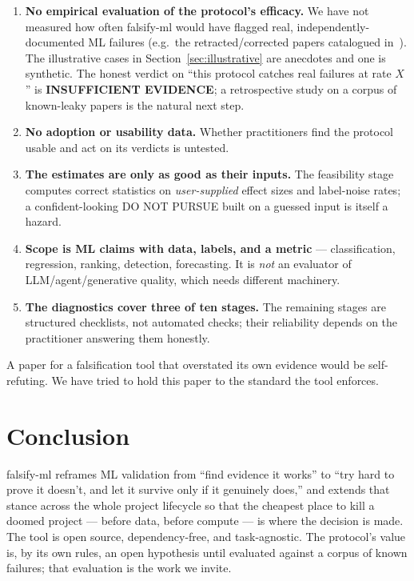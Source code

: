 \documentclass[11pt]{article}
\begin{document}
\begin{enumerate}[leftmargin=*]
\item \textbf{No empirical evaluation of the protocol's efficacy.} We have not measured how often
falsify-ml would have flagged real, independently-documented ML failures (e.g.\ the
retracted/corrected papers catalogued in~\cite{kapoor2023leakage}). The illustrative cases in
Section~\ref{sec:illustrative} are anecdotes and one is synthetic. The honest verdict on ``this
protocol catches real failures at rate $X$'' is \textbf{INSUFFICIENT EVIDENCE}; a retrospective study
on a corpus of known-leaky papers is the natural next step.
\item \textbf{No adoption or usability data.} Whether practitioners find the protocol usable and act
on its verdicts is untested.
\item \textbf{The estimates are only as good as their inputs.} The feasibility stage computes correct
statistics on \emph{user-supplied} effect sizes and label-noise rates; a confident-looking DO NOT
PURSUE built on a guessed input is itself a hazard.
\item \textbf{Scope is ML claims with data, labels, and a metric} --- classification, regression,
ranking, detection, forecasting. It is \emph{not} an evaluator of LLM/agent/generative quality, which
needs different machinery.
\item \textbf{The diagnostics cover three of ten stages.} The remaining stages are structured
checklists, not automated checks; their reliability depends on the practitioner answering them
honestly.
\end{enumerate}

A paper for a falsification tool that overstated its own evidence would be self-refuting. We have
tried to hold this paper to the standard the tool enforces.

\section{Conclusion}

falsify-ml reframes ML validation from ``find evidence it works'' to ``try hard to prove it doesn't,
and let it survive only if it genuinely does,'' and extends that stance across the whole project
lifecycle so that the cheapest place to kill a doomed project --- before data, before compute --- is
where the decision is made. The tool is open source, dependency-free, and task-agnostic. The
protocol's value is, by its own rules, an open hypothesis until evaluated against a corpus of known
failures; that evaluation is the work we invite.
\end{document}
